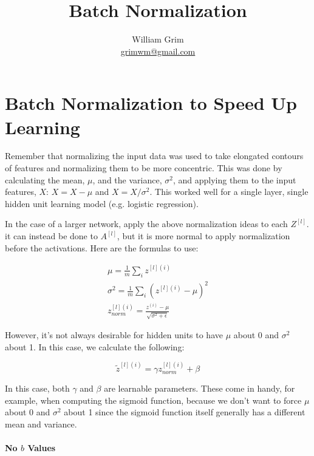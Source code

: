 \documentclass{article}
\begin{document}
\title {Batch Normalization}
\author{William Grim \\ \href{mailto:grimwm@gmail.com}{grimwm@gmail.com}}

\maketitle

\tableofcontents

\section{Batch Normalization to Speed Up Learning}

Remember that normalizing the input data was used to take elongated contours of features and normalizing them to be more concentric.  This was done by calculating the mean, $\mu$, and the variance, $\sigma^2$, and applying them to the input features, $X$: $X = X - \mu$ and $X = X / \sigma^2$.  This worked well for a single layer, single hidden unit learning model (e.g. logistic regression).

In the case of a larger network, apply the above normalization ideas to each $Z^{[l]}$.  it can instead be done to $A^{[l]}$, but it is more normal to apply normalization before the activations.  Here are the formulas to use:

\begin{gather}
\mu = \frac{1}{m} \sum_i z^{[l](i)} \\
\sigma^2 = \frac{1}{m} \sum_i \left(z^{[l](i)} - \mu\right)^2 \\
z_{norm}^{[l](i)} = \frac{z^{(i)} - \mu}{\sqrt{\sigma^2 + \epsilon}}
\end{gather}

However, it's not always desirable for hidden units to have $\mu$ about 0 and $\sigma^2$ about 1.  In this case, we calculate the following:

\begin{equation}
\tilde{z}^{[l](i)} = \gamma z_{norm}^{[l](i)} + \beta
\end{equation}

In this case, both $\gamma$ and $\beta$ are learnable parameters.  These come in handy, for example, when computing the sigmoid function, because we don't want to force $\mu$ about 0 and $\sigma^2$ about 1 since the sigmoid function itself generally has a different mean and variance.

\paragraph{No $b$ Values}
\end{document}
